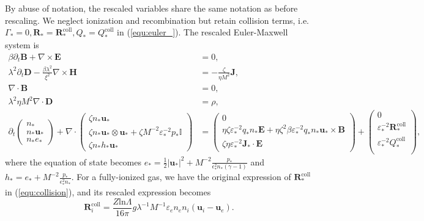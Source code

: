 \documentclass{article}
\begin{document}
By abuse of notation, the rescaled variables share the same notation as before
rescaling. We neglect ionization and recombination but retain collision terms,
i.e. $\Gamma_* = 0, \mathbf{R}_* = \mathbf{R}_*^\text{coll}, Q_* = Q_*^\text{coll}$ in
(\ref{equ:euler_}). The rescaled Euler-Maxwell system is
\begin{subequations}
\begin{align}
  \beta \partial_t \mathbf{B} + \nabla \times \mathbf{E} &= 0, \label{equ:maxwell_faraday_rescalling} \\ 
  \lambda^2 \partial_t \mathbf{D} - \frac{\beta \lambda^2}{\xi^2}\nabla \times \mathbf{H} &= - \frac{\zeta}{\eta M^2}\mathbf{J}, \label{equ:maxwell_ampere_rescalling} \\
  \nabla \cdot \mathbf{B} &= 0,  \label{equ:maxwell_gauss_B_rescalling}\\
  \lambda^2 \eta M^2 \nabla \cdot \mathbf{D} &= \rho, \label{equ:maxwell_gauss_D_rescalling} \\
  \partial_t
    \begin{pmatrix}
    n_* \\
    n_* \mathbf{u}_* \\
    n_* e_*
    \end{pmatrix}
    + \nabla \cdot
    \begin{pmatrix}
    \zeta n_* \mathbf{u}_* \\
    \zeta n_* \mathbf{u}_* \otimes \mathbf{u}_* + \zeta M^{-2} \varepsilon_*^{-2} p_*\mathbb{I} \\
    \zeta n_* h_* \mathbf{u}_*
    \end{pmatrix}
    &=
    \begin{pmatrix}
    0 \\
    \eta \zeta \varepsilon_*^{-2} q_* n_*\mathbf{E} + \eta \zeta^2 \beta \varepsilon_*^{-2} q_* n_* \mathbf{u}_* \times \mathbf{B} \\
    \zeta \eta \varepsilon_*^{-2} \mathbf{J}_* \cdot \mathbf{E}
    \end{pmatrix} +
    \begin{pmatrix}
    0 \\
    \varepsilon_*^{-2}\mathbf{R}_*^{\text{coll}} \\
    \varepsilon_*^{-2}Q_*^{\text{coll}} \\
    \end{pmatrix}, \label{equ:euler_rescalling}
\end{align}
\end{subequations}
where the equation of state becomes
$e_* = \frac{1}{2}|\mathbf{u_*}|^2 + M^{-2}\frac{p_*}{\epsilon^2_* n_* (\gamma - 1)}$ and
$h_* = e_* + M^{-2}\frac{p_*}{\epsilon^2_* n_*}$. For a fully-ionized gas, we have the
original expression of $\mathbf{R}_*^{\text{coll}}$ in (\ref{equ:collision}), and its
rescaled expression becomes
\begin{equation}
    \mathbf{R}_i^{\text{coll}} = \frac{Z\text{ln}\Lambda}{16\pi}g\lambda^{-1}M^{-1}\varepsilon_en_en_i(\mathbf{u}_i - \mathbf{u}_e). \label{equ:rescaling_friction}
\end{equation}
\end{document}
